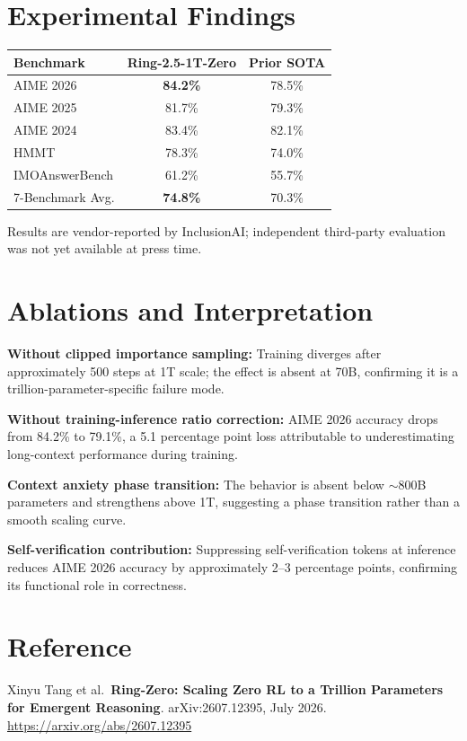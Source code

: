 \documentclass[10pt,twocolumn]{article}
\begin{document}
\section{Experimental Findings}

\begin{center}
\small
\begin{tabular}{lcc}
\toprule
Benchmark & Ring-2.5-1T-Zero & Prior SOTA \\
\midrule
AIME 2026 & \textbf{84.2\%} & 78.5\% \\
AIME 2025 & 81.7\% & 79.3\% \\
AIME 2024 & 83.4\% & 82.1\% \\
HMMT & 78.3\% & 74.0\% \\
IMOAnswerBench & 61.2\% & 55.7\% \\
\midrule
7-Benchmark Avg. & \textbf{74.8\%} & 70.3\% \\
\bottomrule
\end{tabular}
\end{center}

Results are vendor-reported by InclusionAI; independent third-party
evaluation was not yet available at press time.

\section{Ablations and Interpretation}

\textbf{Without clipped importance sampling:} Training diverges
after approximately 500 steps at 1T scale; the effect is absent at
70B, confirming it is a trillion-parameter-specific failure mode.

\textbf{Without training-inference ratio correction:} AIME 2026 accuracy
drops from 84.2\% to 79.1\%, a 5.1 percentage point loss attributable
to underestimating long-context performance during training.

\textbf{Context anxiety phase transition:} The behavior is absent
below $\sim$800B parameters and strengthens above 1T, suggesting a
phase transition rather than a smooth scaling curve.

\textbf{Self-verification contribution:} Suppressing self-verification
tokens at inference reduces AIME 2026 accuracy by approximately 2--3
percentage points, confirming its functional role in correctness.

\section*{Reference}

Xinyu Tang et al.\
\textbf{Ring-Zero: Scaling Zero RL to a Trillion Parameters for
Emergent Reasoning}.
arXiv:2607.12395, July 2026.
\url{https://arxiv.org/abs/2607.12395}
\end{document}
